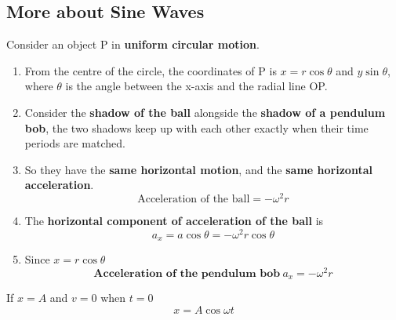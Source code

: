 \subsection{More about Sine Waves}

Consider an object P in \textbf{uniform circular motion}.
\begin{enumerate}
    \item From the centre of the circle, the coordinates of P is $x=r\cos\theta$ and $y\sin\theta$, where $\theta$ is the angle between the x-axis and the radial line OP.
    \item Consider the \textbf{shadow of the ball} alongside the \textbf{shadow of a pendulum bob}, the two shadows keep up with each other exactly when their time periods are matched.
    \item So they have the \textbf{same horizontal motion}, and the \textbf{same horizontal acceleration}.
        $$\text{Acceleration of the ball}=-\omega^2r$$
    \item The \textbf{horizontal component of acceleration of the ball} is
        $$a_x=a\cos\theta=-\omega^2r\cos\theta$$
    \item Since $x=r\cos\theta$
        $$\textbf{Acceleration of the pendulum bob}\ a_x=-\omega^2r$$
\end{enumerate}

If $x=A$ and $v=0$ when $t=0$
$$x=A\cos\omega t$$
